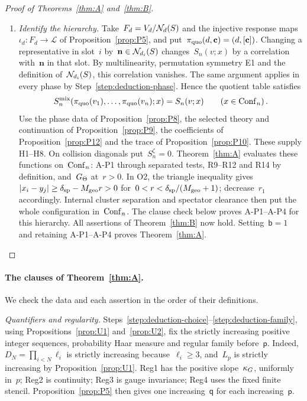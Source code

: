 \begin{proof}[Proof of Theorems~\ref{thm:A} and~\ref{thm:B}]
\begin{enumerate}[label=\emph{Step \arabic*:},ref=\arabic*,leftmargin=4.5em,itemsep=0.4em,beginpenalty=10000]
\item\label{step:deduction-hierarchy} \emph{Identify the hierarchy.} Take~$F_d=V_d/\mathcal{N}_{d}(S)$ and the injective response maps~$\iota_d:F_d\to\mathcal L$ of Proposition~\ref{prop:P5}, and put~$\pi_{\rm quo}(d,\mathbf c)=(d,[\mathbf c])$. Changing a representative in slot~$i$ by~$\mathbf n\in\mathcal{N}_{d_i}(S)$ changes~$S_n(v;x)$ by a correlation with~$\mathbf n$ in that slot. By multilinearity, permutation symmetry E1 and the definition of~$\mathcal{N}_{d_i}(S)$, this correlation vanishes. The same argument applies in every phase by Step~\ref{step:deduction-phase}. Hence the quotient table satisfies
\begin{equation}\label{eq:deduction-quotient}
S_n^{\rm mix}(\pi_{\rm quo}(v_1),\ldots,\pi_{\rm quo}(v_n);x)=S_n(v;x)\qquad(x\in\mathrm{Conf}_{n})\,.
\end{equation}
Use the phase data of Proposition~\ref{prop:P8}, the selected theory and continuation of Proposition~\ref{prop:P9}, the coefficients of Proposition~\ref{prop:P12} and the trace of Proposition~\ref{prop:P10}. These supply H1--H8. On collision diagonals put~$S_n^\zeta=0$. Theorem~\ref{thm:A} evaluates these functions on~$\mathrm{Conf}_{n}$: A-P1 through separated tests, R9--R12 and R14 by definition, and~$G_{\Theta}$ at~$r>0$. In O2, the triangle inequality gives~$|x_i-y_j|\ge\delta_{\rm sp}-M_{\rm geo}r>0$ for~$0<r<\delta_{\rm sp}/(M_{\rm geo}+1)$; decrease~$r_1$ accordingly. Internal cluster separation and spectator clearance then put the whole configuration in~$\mathrm{Conf}_{n}$. The clause check below proves A-P1--A-P4 for this hierarchy. All assertions of Theorem~\ref{thm:B} now hold. Setting~$\mathsf b=1$ and retaining A-P1--A-P4 proves Theorem~\ref{thm:A}.\qedhere
\end{enumerate}
\end{proof}

\begin{samepage}
\paragraph{The clauses of Theorem~\ref{thm:A}.}
We check the data and each assertion in the order of their definitions.

\emph{Quantifiers and regularity.} Steps~\ref{step:deduction-choice}--\ref{step:deduction-family}, using Propositions~\ref{prop:U1} and~\ref{prop:U2}, fix the strictly increasing positive integer sequences, probability Haar measure and regular family before~$\mathsf p$. Indeed, $D_N=\prod_{i<N}\ell_i$ is strictly increasing because~$\ell_i\ge3$, and~$L_p$ is strictly increasing by Proposition~\ref{prop:U1}. Reg1 has the positive slope~$\kappa_G$, uniformly in~$p$; Reg2 is continuity; Reg3 is gauge invariance; Reg4 uses the fixed finite stencil. Proposition~\ref{prop:P5} then gives one increasing~$\mathsf q$ for each increasing~$\mathsf p$.

\end{samepage}

